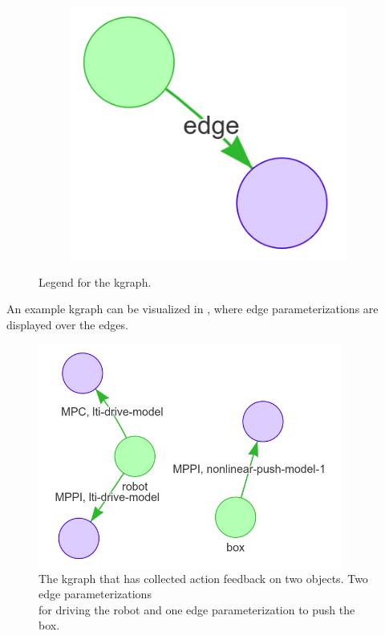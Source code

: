 \begin{figure}[H]
\begin{subfigure}{0.3\textwidth}
    \caption{}%
    \end{subfigure}
    \begin{subfigure}{0.3\textwidth}
    \centering
    \includegraphics[width=\textwidth]{figures/proposed_method/kgraph_edge}
    \caption{}
    \end{subfigure}
    \caption{Legend for the \acl{kgraph}.}%
    \label{fig:kgraph_legend}
\end{figure}

An example \ac{kgraph} can be visualized in , where edge parameterizations are displayed over the edges.\bs

\begin{figure}[H]
    \centering
    \includegraphics[width=10cm]{figures/proposed_method/kgraph_example}
    \caption{The \ac{kgraph} that has collected action feedback on two objects. Two edge parameterizations\\for driving the robot and one edge parameterization to push the box.}%
    \label{fig:kgraph_example}
\end{figure}
